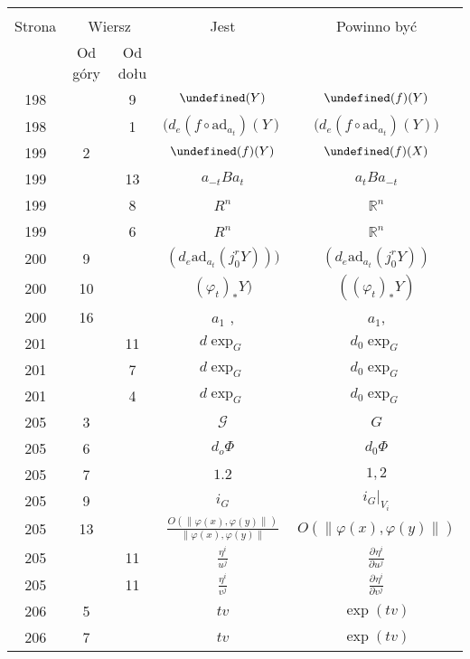 \documentclass[a4paper,11pt]{article}
\newcommand{\fr}{\frac}
\newcommand{\mb}{\mathbb}
\newcommand{\mc}{\mathcal}
\newcommand{\mr}{\mathrm}
\newcommand{\pr}{\partial}
\newcommand{\ad}{\mr{ad}}
\newcommand{\vp}{\varphi}
\newcommand{\R}{\mb{R}}
\newcommand{\G}{\mc{G}}
\let\L\undefined
\newcommand{\L}{\mc{L}}
\newcommand{\pd}[3]{\frac{ \pr^{ #1 } { #2 } }{ \pr { #3 }^{ #1 } }}
\providecommand{\norm}[1]{\lVert #1 \rVert}
\begin{document}
\begin{center}
  \begin{tabular}{|c|c|c|c|c|}
    \hline
    & \multicolumn{2}{c|}{} & & \\
    Strona & \multicolumn{2}{c|}{Wiersz}& Jest & Powinno być \\ \cline{2-3}
    & Od góry & Od dołu &  &  \\ \hline
    198 & & 9 & $\L( Y )$ & $\L( f )( Y )$ \\
    198 & & 1 & $( d_{ e }( f \circ \ad_{ a_{ t } } )( Y )$
           & $\big( d_{ e }( f \circ \ad_{ a_{ t } } )( Y ) \big)$ \\
    199 & 2 & & $\L( f )( Y )$ & $\L( f )( X )$ \\
    199 & & 13 & $a_{ -t } B a_{ t }$ & $a_{ t } B a_{ -t }$ \\
    199 & &  8 & $R^{ n }$ & $\R^{ n }$ \\
    199 & &  6 & $R^{ n }$ & $\R^{ n }$ \\
    200 & 9 & & $( d_{ e }\ad_{ a_{ t } }( j^{ r }_{ 0 }Y ) ) )$
           & $( d_{ e }\ad_{ a_{ t } }( j^{ r }_{ 0 }Y ) )$ \\
    200 & 10 & & $( \vp_{ t } )_{ * }Y )$ & $( ( \vp_{ t } )_{ * }Y )$ \\
    200 & 16 & & $a_{ 1 }$ , & $a_{ 1 }$, \\
    201 & & 11 & $d \exp_{ G }$ & $d_{ 0 } \exp_{ G }$ \\
    201 & &  7 & $d \exp_{ G }$ & $d_{ 0 } \exp_{ G }$ \\
    201 & &  4 & $d \exp_{ G }$ & $d_{ 0 } \exp_{ G }$ \\
    205 &  3 & & $\G$ & $G$ \\
    205 &  6 & & $d_{ o }\Phi$ & $d_{ 0 }\Phi$ \\
    205 &  7 & & $1.2$ & $1, 2$ \\
    205 &  9 & & $i_{ G }$ & $i_{ G }|_{ V_{ i } }$ \\
    205 & 13 & & $\fr{ O( \norm{ \vp( x ), \vp( y ) } ) }
                 { \norm{ \vp( x ), \vp( y ) } }$
           & $O( \norm{ \vp( x ), \vp( y ) } )$ \\
    205 & & 11 & $\fr{ \eta^{ i } }{ u^{ j } }$
           & $\pd{}{ { \eta^{ i } } }{ { u^{ j } } }$ \\
    205 & & 11 & $\fr{ \eta^{ i } }{ v^{ j } }$
           & $\pd{}{ { \eta^{ i } } }{ { v^{ j } } }$ \\
    206 &  5 & & $t v$ & $\exp( t v )$ \\
    206 &  7 & & $t v$ & $\exp( t v )$ \\

\end{tabular}
\end{center}
\end{document}
